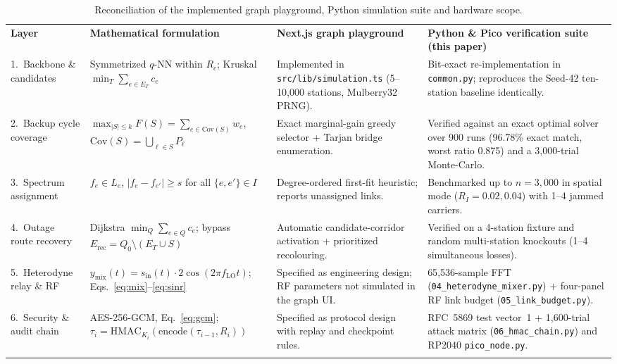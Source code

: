 \documentclass[10pt,a4paper]{article}
\newcommand\toprule{\noalign{\hrule height 0.8pt\vskip 2pt}}
\newcommand\midrule{\noalign{\vskip 1pt\hrule height 0.4pt\vskip 2pt}}
\newcommand\lightrule{\noalign{\vskip 2pt}}
\newcommand\bottomrule{\noalign{\vskip 1pt\hrule height 0.8pt}}
\newcommand\thd[1]{\textbf{#1}}
\begin{document}
\begin{table}[t]
\caption{Reconciliation of the implemented graph playground, Python simulation suite and hardware scope.}
\label{tab:scope}
\footnotesize
\begin{tabularx}{\textwidth}{@{}P{2.3cm}P{3.6cm}LL@{}}
\toprule
\thd{Layer} & \thd{Mathematical formulation} & \thd{Next.js graph playground~\cite{smartlink}} & \thd{Python \& Pico verification suite (this paper)}\\
\midrule
1.~Backbone \& candidates & Symmetrized $q$-NN within $R_c$; Kruskal $\min_T\sum_{e\in E_T}c_e$ &
  Implemented in \texttt{src/lib/simulation.ts} (5--10{,}000 stations, Mulberry32 PRNG). &
  Bit-exact re-implementation in \texttt{common.py}; reproduces the Seed-42 ten-station baseline identically.\\
\lightrule
2.~Backup cycle coverage & $\max_{|S|\le k}F(S)=\sum_{e\in\mathrm{Cov}(S)}w_e$, $\mathrm{Cov}(S)=\bigcup_{\ell\in S}P_\ell$ &
  Exact marginal-gain greedy selector + Tarjan bridge enumeration. &
  Verified against an exact optimal solver over 900 runs (96.78\% exact match, worst ratio 0.875) and a 3{,}000-trial Monte-Carlo.\\
\lightrule
3.~Spectrum assignment & $f_e\in L_e$, $|f_e-f_{e'}|\ge s$ for all $\{e,e'\}\in I$ &
  Degree-ordered first-fit heuristic; reports unassigned links. &
  Benchmarked up to $n=3{,}000$ in spatial mode ($R_I=0.02,0.04$) with 1--4 jammed carriers.\\
\lightrule
4.~Outage route recovery & Dijkstra $\min_Q\sum_{e\in Q}c_e$; bypass $E_\text{rec}=Q_0\setminus(E_T\cup S)$ &
  Automatic candidate-corridor activation + prioritized recolouring. &
  Verified on a 4-station fixture and random multi-station knockouts (1--4 simultaneous losses).\\
\lightrule
5.~Heterodyne relay \& RF & $y_\text{mix}(t)=s_\text{in}(t)\cdot2\cos(2\pi f_\text{LO}t)$; Eqs.~\eqref{eq:mix}--\eqref{eq:sinr} &
  Specified as engineering design; RF parameters not simulated in the graph UI. &
  65{,}536-sample FFT (\texttt{04\_heterodyne\_mixer.py}) + four-panel RF link budget (\texttt{05\_link\_budget.py}).\\
\lightrule
6.~Security \& audit chain & AES-256-GCM, Eq.~\eqref{eq:gcm}; $\tau_i=\mathrm{HMAC}_{K_i}(\mathrm{encode}(\tau_{i-1},R_i))$ &
  Specified as protocol design with replay and checkpoint rules. &
  RFC~5869 test vector~1 + 1{,}600-trial attack matrix (\texttt{06\_hmac\_chain.py}) and RP2040 \texttt{pico\_node.py}.\\
\bottomrule
\end{tabularx}
\end{table}
\end{document}
